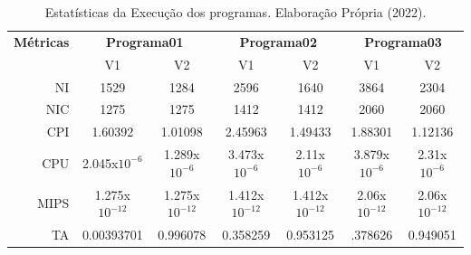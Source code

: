\documentclass[12pt]{article}
\begin{document}
\begin{table}[ht]
  \caption{Estatísticas da Execução dos programas. Elaboração Própria (2022).}
  \begin{center}
    \label{tab_programas}
    \begin{tabular}{rcccccc}
      \hline
      \small{\textbf{Métricas}} & \multicolumn{2}{c}{\small{\textbf{Programa01}}} & \multicolumn{2}{c}{\small{\textbf{Programa02}}} & \multicolumn{2}{c}{\small{\textbf{Programa03}}}                                                                                                     \\
                                & V1                                              & V2                                              & V1                                              & V2                              & V1                             & V2                             \\
      \hline
      NI                        & \footnotesize{1529}                             & \footnotesize{1284}                             & \footnotesize{2596}                             & \footnotesize{1640}             & \footnotesize{3864}            & \footnotesize{2304}            \\
      NIC                       & \footnotesize{1275}                             & \footnotesize{1275}                             & \footnotesize{1412}                             & \footnotesize{1412}             & \footnotesize{2060}            & \footnotesize{2060}            \\
      CPI                       & \footnotesize{1.60392}                          & \footnotesize{1.01098}                          & \footnotesize{2.45963}                          & \footnotesize{1.49433}          & \footnotesize{1.88301}         & \footnotesize{1.12136}         \\
      CPU                       & \footnotesize{2.045x$10^{-6}$}                  & \footnotesize{1.289x$10^{-6}$}                  & \footnotesize{3.473x$10^{-6}$}                  & \footnotesize{2.11x$10^{-6}$}   & \footnotesize{3.879x$10^{-6}$} & \footnotesize{2.31x$10^{-6}$}  \\
      MIPS                      & \footnotesize{1.275x$10^{-12}$}                 & \footnotesize{1.275x$10^{-12}$}                 & \footnotesize{1.412x$10^{-12}$}                 & \footnotesize{1.412x$10^{-12}$} & \footnotesize{2.06x$10^{-12}$} & \footnotesize{2.06x$10^{-12}$} \\
      TA                        & \footnotesize{0.00393701}                       & \footnotesize{0.996078}                         & \footnotesize{0.358259}                         & \footnotesize{0.953125}         & \footnotesize{.378626}         & \footnotesize{0.949051}        \\
    \end{tabular}
  \end{center}
  \label{tab:multicol}
\end{table}
\end{document}
